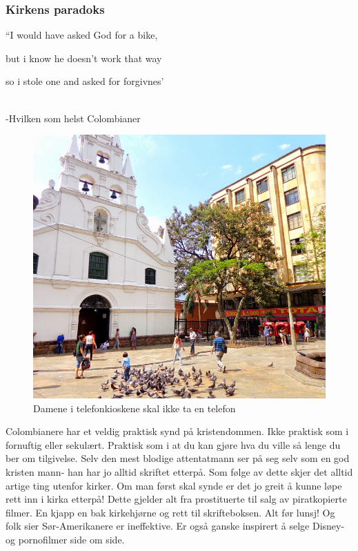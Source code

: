 \subsubsection{Kirkens paradoks}

\begin{dialogue}
	\item ``I would have asked God for a bike,
	\item but i know he doesn't work that way
	\item so i stole one and asked for forgivnes'
\end{dialogue}\\ -Hvilken som helst Colombianer

\begin{figure}[!h]
	\centering
\includegraphics[width=\textwidth]{workinghard}
	\caption{Damene i telefonkioskene skal ikke ta en telefon}
\label{fig:prosti}
\end{figure}
Colombianere har et veldig praktisk synd på kristendommen. Ikke
praktisk som i fornuftig eller sekulært. Praktisk som i at du kan gjøre
hva du ville så lenge du ber om tilgivelse. Selv den mest blodige
attentatmann ser på seg selv som en god kristen mann- han har jo
alltid skriftet etterpå. Som følge av dette skjer det alltid artige
ting utenfor kirker. Om man først skal synde er det jo greit å kunne
løpe rett inn i kirka etterpå! Dette gjelder alt fra prostituerte til
salg av  piratkopierte filmer. En kjapp en bak kirkehjørne og
rett til skrifteboksen. Alt før lunsj! Og folk sier Sør-Amerikanere er
ineffektive. Er også ganske inspirert å selge Disney- og pornofilmer
side om side.

